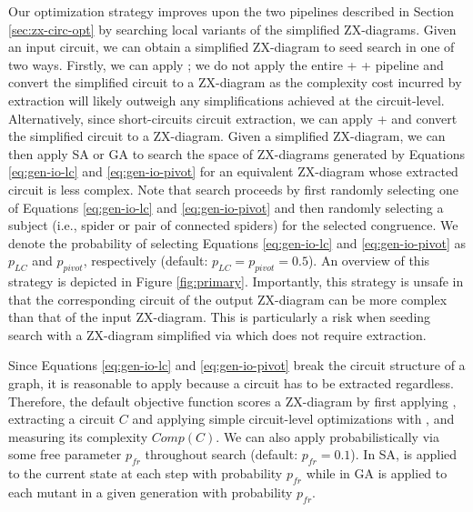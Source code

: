 Our optimization strategy improves upon the two pipelines described in Section \ref{sec:zx-circ-opt} by searching local variants of the simplified ZX-diagrams.
Given an input circuit, we can obtain a simplified ZX-diagram to seed search in one of two ways.
Firstly, we can apply ;
we do not apply the entire  +  +  pipeline and convert the simplified circuit to a ZX-diagram as the complexity cost incurred by extraction will likely outweigh any simplifications achieved at the circuit-level.
Alternatively, since  short-circuits circuit extraction, we can apply  +  and convert the simplified circuit to a ZX-diagram.
Given a simplified ZX-diagram, we can then apply SA or GA to search the space of ZX-diagrams generated by Equations \ref{eq:gen-io-lc} and \ref{eq:gen-io-pivot} for an equivalent ZX-diagram whose extracted circuit is less complex.
Note that search proceeds by first randomly selecting one of Equations \ref{eq:gen-io-lc} and \ref{eq:gen-io-pivot} and then randomly selecting a subject (i.e., spider or pair of connected spiders) for the selected congruence.
We denote the probability of selecting Equations \ref{eq:gen-io-lc} and \ref{eq:gen-io-pivot} as $p_{LC}$ and $p_{pivot}$, respectively (default: $p_{LC} = p_{pivot} = 0.5$).
An overview of this strategy is depicted in Figure \ref{fig:primary}.
Importantly, this strategy is unsafe in that the corresponding circuit of the output ZX-diagram can be more complex than that of the input ZX-diagram.
This is particularly a risk when seeding search with a ZX-diagram simplified via  which does not require extraction.

Since Equations \ref{eq:gen-io-lc} and \ref{eq:gen-io-pivot} break the circuit structure of a graph, it is reasonable to apply  because a circuit has to be extracted regardless.
Therefore, the default objective function scores a ZX-diagram by first applying , extracting a circuit $C$ and applying simple circuit-level optimizations with , and measuring its complexity $Comp(C)$.
We can also apply  probabilistically via some free parameter $p_{fr}$ throughout search (default: $p_{fr} = 0.1$).
In SA,  is applied to the current state at each step with probability $p_{fr}$ while in GA  is applied to each mutant in a given generation with probability $p_{fr}$.

